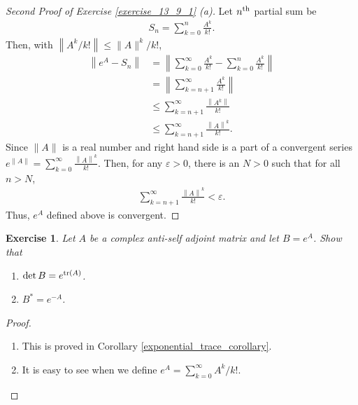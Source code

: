 \documentclass[11pt]{book}
\newtheorem{exercise}{Exercise}[section]
\theoremstyle{definition}
\numberwithin{equation}{chapter}
\begin{document}
\begin{proof}[Second Proof of Exercise \ref{exercise_13_9_1} (a)] \cite{42}
Let $n^{\rm th}$ partial sum be 
\begin{align*}
    S_n = \sum^n_{k=0} \frac{A^k}{k!}.
\end{align*}
Then, with $\left\| A^k / k! \right\| \leq \|A\|^k / k!$,
\begin{align*}
    \left\| e^A - S_n \right\| & = \left\| \sum^\infty_{k=0} \frac{A^k}{k!} - \sum^n_{k=0} \frac{A^k}{k!} \right\| \\
    & = \left\| \sum^\infty_{k=n+1} \frac{A^k}{k!} \right\| \\
    & \leq \sum^\infty_{k=n+1} \frac{\left\|A^k\right\|}{k!} \\
    & \leq \sum^\infty_{k=n+1} \frac{\left\|A\right\|^k}{k!}.
\end{align*}
Since $\|A\|$ is a real number and right hand side is a part of a convergent series $e^{\|A\|} = \sum^\infty_{k=0} \frac{\left\|A\right\|^k}{k!}$. Then, for any $\varepsilon > 0$, there is an $N > 0$ such that for all $n > N$,
\begin{align*}
    \sum^\infty_{k=n+1} \frac{\left\|A\right\|^k}{k!} < \varepsilon.
\end{align*}
Thus, $e^A$ defined above is convergent.
\end{proof}

\medskip

\begin{exercise}
Let $A$ be a complex anti-self adjoint matrix and let $B = e^A$. Show that
\begin{enumerate}[label=(\alph*)]
    \item $\det B = e^{\tr(A)}$.
    
    \item $B^* = e^{-A}$.
\end{enumerate}
\end{exercise}
\begin{proof}
~\begin{enumerate}[label=(\alph*)]
    \item This is proved in Corollary \ref{exponential_trace_corollary}.
    
    \item It is easy to see when we define $e^A = \sum^\infty_{k=0} A^k/k!$.
\end{enumerate}
\end{proof}

\medskip
\end{document}

